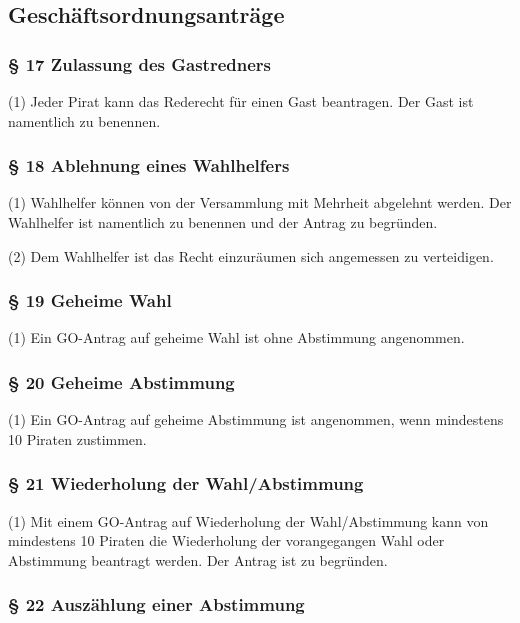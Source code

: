 \subsection{Geschäftsordnungsanträge}

\subsubsection{§ 17 Zulassung des Gastredners}

(1) Jeder Pirat kann das Rederecht für einen Gast beantragen. Der Gast
ist namentlich zu benennen.

\subsubsection{§ 18 Ablehnung eines Wahlhelfers}

(1) Wahlhelfer können von der Versammlung mit Mehrheit abgelehnt werden.
Der Wahlhelfer ist namentlich zu benennen und der Antrag zu begründen.

(2) Dem Wahlhelfer ist das Recht einzuräumen sich angemessen zu
verteidigen.

\subsubsection{§ 19 Geheime Wahl}

(1) Ein GO-Antrag auf geheime Wahl ist ohne Abstimmung angenommen.

\subsubsection{§ 20 Geheime Abstimmung}

(1) Ein GO-Antrag auf geheime Abstimmung ist angenommen, wenn mindestens
10 Piraten zustimmen.

\subsubsection{§ 21 Wiederholung der Wahl/Abstimmung}

(1) Mit einem GO-Antrag auf Wiederholung der Wahl/Abstimmung kann von
mindestens 10 Piraten die Wiederholung der vorangegangen Wahl oder
Abstimmung beantragt werden. Der Antrag ist zu begründen.

\subsubsection{§ 22 Auszählung einer Abstimmung}

